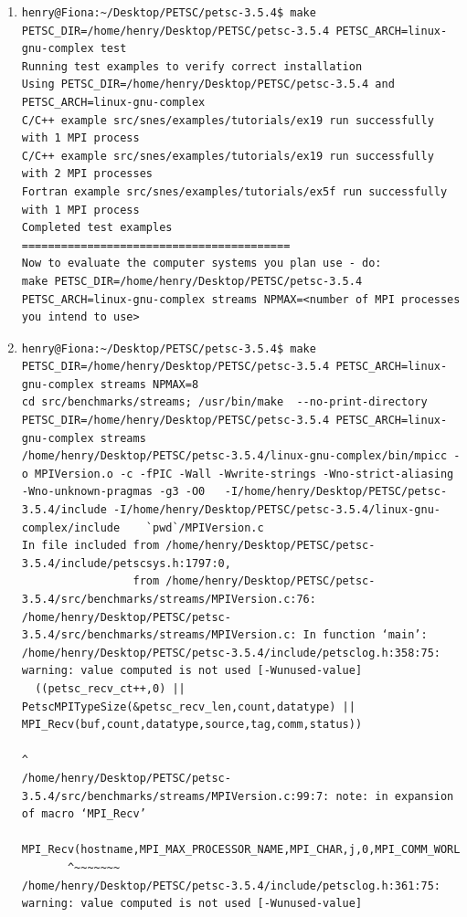 \documentclass{article}
\begin{document}
\begin{enumerate}
\begin{verbatim}
\end{verbatim}
\normalsize
\item 
\tiny
\begin{verbatim}
henry@Fiona:~/Desktop/PETSC/petsc-3.5.4$ make PETSC_DIR=/home/henry/Desktop/PETSC/petsc-3.5.4 PETSC_ARCH=linux-gnu-complex test
Running test examples to verify correct installation
Using PETSC_DIR=/home/henry/Desktop/PETSC/petsc-3.5.4 and PETSC_ARCH=linux-gnu-complex
C/C++ example src/snes/examples/tutorials/ex19 run successfully with 1 MPI process
C/C++ example src/snes/examples/tutorials/ex19 run successfully with 2 MPI processes
Fortran example src/snes/examples/tutorials/ex5f run successfully with 1 MPI process
Completed test examples
=========================================
Now to evaluate the computer systems you plan use - do:
make PETSC_DIR=/home/henry/Desktop/PETSC/petsc-3.5.4 PETSC_ARCH=linux-gnu-complex streams NPMAX=<number of MPI processes you intend to use>
\end{verbatim}
\normalsize
\item 
\tiny
\begin{verbatim}
henry@Fiona:~/Desktop/PETSC/petsc-3.5.4$ make PETSC_DIR=/home/henry/Desktop/PETSC/petsc-3.5.4 PETSC_ARCH=linux-gnu-complex streams NPMAX=8
cd src/benchmarks/streams; /usr/bin/make  --no-print-directory PETSC_DIR=/home/henry/Desktop/PETSC/petsc-3.5.4 PETSC_ARCH=linux-gnu-complex streams
/home/henry/Desktop/PETSC/petsc-3.5.4/linux-gnu-complex/bin/mpicc -o MPIVersion.o -c -fPIC -Wall -Wwrite-strings -Wno-strict-aliasing -Wno-unknown-pragmas -g3 -O0   -I/home/henry/Desktop/PETSC/petsc-3.5.4/include -I/home/henry/Desktop/PETSC/petsc-3.5.4/linux-gnu-complex/include    `pwd`/MPIVersion.c
In file included from /home/henry/Desktop/PETSC/petsc-3.5.4/include/petscsys.h:1797:0,
                 from /home/henry/Desktop/PETSC/petsc-3.5.4/src/benchmarks/streams/MPIVersion.c:76:
/home/henry/Desktop/PETSC/petsc-3.5.4/src/benchmarks/streams/MPIVersion.c: In function ‘main’:
/home/henry/Desktop/PETSC/petsc-3.5.4/include/petsclog.h:358:75: warning: value computed is not used [-Wunused-value]
  ((petsc_recv_ct++,0) || PetscMPITypeSize(&petsc_recv_len,count,datatype) || MPI_Recv(buf,count,datatype,source,tag,comm,status))
                                                                           ^
/home/henry/Desktop/PETSC/petsc-3.5.4/src/benchmarks/streams/MPIVersion.c:99:7: note: in expansion of macro ‘MPI_Recv’
       MPI_Recv(hostname,MPI_MAX_PROCESSOR_NAME,MPI_CHAR,j,0,MPI_COMM_WORLD,&status);
       ^~~~~~~~
/home/henry/Desktop/PETSC/petsc-3.5.4/include/petsclog.h:361:75: warning: value computed is not used [-Wunused-value]

\end{verbatim}
\end{enumerate}
\end{document}

